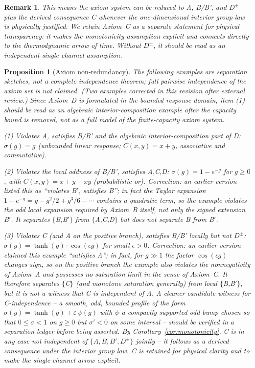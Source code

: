 \documentclass[aps,prd,twocolumn,superscriptaddress,nofootinbib]{revtex4-2}
\newtheorem{proposition}{Proposition}
\newtheorem{remark}{Remark}
\begin{document}
\begin{remark}
This means the axiom system can be reduced to A, B/B', and $D^\pm$ plus the derived consequence C whenever the one-dimensional interior group law is physically justified. We retain Axiom~C as a separate statement for physical transparency: it makes the monotonicity assumption explicit and connects directly to the thermodynamic arrow of time. Without $D^\pm$, it should be read as an independent single-channel assumption.
\end{remark}

\begin{proposition}[Axiom non-redundancy]
\label{prop:independence}
The following examples are \emph{separation sketches}, not a complete independence theorem; full pairwise independence of the axiom set is not claimed. \emph{(Two examples corrected in this revision after external review.)} Since Axiom~D is formulated in the bounded response domain, item (1) should be read as an algebraic interior-composition example after the capacity bound is removed, not as a full model of the finite-capacity axiom system.

\textit{(1) Violates A, satisfies B/B' and the algebraic interior-composition part of D:} $\sigma(g) = g$ (unbounded linear response; $C(x,y) = x+y$, associative and commutative).

\textit{(2) Violates the local oddness of B/B', satisfies A,C,D:} $\sigma(g) = 1 - e^{-g}$ for $g \geq 0$, with $C(x,y) = x + y - xy$ (probabilistic or). \emph{Correction:} an earlier version listed this as ``violates B$'$, satisfies B''; in fact the Taylor expansion $1-e^{-g} = g - g^2/2 + g^3/6 - \cdots$ contains a quadratic term, so the example violates the odd local expansion required by Axiom~B itself, not only the signed extension B$'$. It separates $\{$B,B$'\}$ from $\{$A,C,D$\}$ but does not separate B from B$'$.

\textit{(3) Violates C (and A on the positive branch), satisfies B/B' locally but not $D^\pm$:} $\sigma(g) = \tanh(g) \cdot \cos(\epsilon g)$ for small $\epsilon > 0$. \emph{Correction:} an earlier version claimed this example ``satisfies A''; in fact, for $g \gg 1$ the factor $\cos(\epsilon g)$ changes sign, so on the positive branch the example also violates the nonnegativity of Axiom~A and possesses no saturation limit in the sense of Axiom~C. It therefore separates $\{$C$\}$ (and monotone saturation generally) from local $\{$B,B$'\}$, but it is \emph{not} a witness that C is independent of A. A cleaner candidate witness for C-independence -- a smooth, odd, bounded profile of the form $\sigma(g) = \tanh(g) + \varepsilon\,\psi(g)$ with $\psi$ a compactly supported odd bump chosen so that $0 \leq \sigma < 1$ on $g \geq 0$ but $\sigma' < 0$ on some interval -- should be verified in a separation ledger before being asserted. By Corollary~\ref{cor:monotonicity}, C is in any case \textit{not} independent of $\{A, B, B', D^\pm\}$ jointly -- it follows as a derived consequence under the interior group law. C is retained for physical clarity and to make the single-channel arrow explicit.


\end{proposition}
\end{document}
